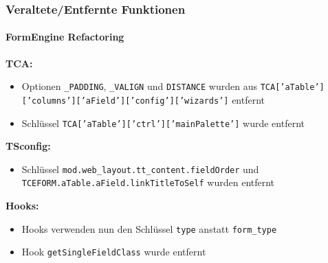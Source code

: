 %

\begin{frame}[fragile]
	\frametitle{Veraltete/Entfernte Funktionen}
	\framesubtitle{FormEngine Refactoring}

		\textbf{TCA:}

			\small
			\begin{itemize}

				\item Optionen \texttt{\_PADDING}, \texttt{\_VALIGN} und \texttt{DISTANCE}
					wurden aus \texttt{TCA['aTable']['columns']['aField']['config']['wizards']}
					entfernt

				\item Schlüssel \texttt{TCA['aTable']['ctrl']['mainPalette']} wurde entfernt

			\end{itemize}

		\textbf{TSconfig:}

			\small
			\begin{itemize}
				\item Schlüssel \texttt{mod.web\_layout.tt\_content.fieldOrder} und
					\texttt{TCEFORM.aTable.aField.linkTitleToSelf} wurden entfernt
			\end{itemize}

		\textbf{Hooks:}

			\small
			\begin{itemize}
				\item Hooks verwenden nun den Schlüssel \texttt{type} anstatt \texttt{form\_type}
				\item Hook \texttt{getSingleFieldClass} wurde entfernt
			\end{itemize}

\end{frame}

